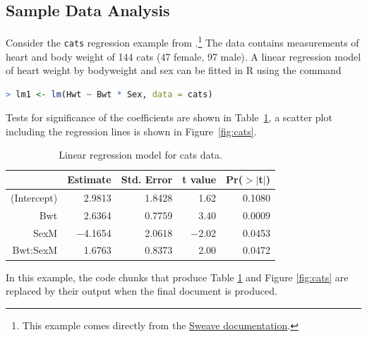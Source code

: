 \documentclass[11pt,article,oneside]{memoir}
\begin{document}
\subsection*{Sample Data Analysis} %
\label{sec:sample_data_analysis}
Consider the \texttt{cats} regression example from
\citet{venables02:_moder_applied_statis_s_plus}.\footnote{This example comes
  directly from the \href{http://www.ci.tuwien.ac.at/~leisch/Sweave/}{Sweave documentation}.} The data contains 
measurements of heart and body weight of 144 cats (47 female, 97 male). A
linear regression model of heart weight by bodyweight and sex can be fitted in
R using the command

\begin{lstlisting}[language=R,numbers=none]
> lm1 <- lm(Hwt ~ Bwt * Sex, data = cats)
\end{lstlisting}
\normalsize 
Tests for significance of the coefficients are shown in
Table~\ref{tab:coef}, a scatter plot including the regression lines is
shown in Figure~\ref{fig:cats}.


\begin{table}[ht]
\footnotesize
\begin{center}
\begin{tabular}{rrrrr}
\hline
 & Estimate & Std. Error & t value & Pr($>$$|$t$|$) \\
\hline
(Intercept) & 2.9813 & 1.8428 & 1.62 & 0.1080 \\
Bwt & 2.6364 & 0.7759 & 3.40 & 0.0009 \\
SexM & $-$4.1654 & 2.0618 & $-$2.02 & 0.0453 \\
Bwt:SexM & 1.6763 & 0.8373 & 2.00 & 0.0472 \\
\hline
\end{tabular}
\caption{\small Linear regression model for cats data.}
\label{tab:coef}
\end{center}
\end{table}
\normalsize 

In this example, the code chunks that produce Table \ref{tab:coef} and Figure
\ref{fig:cats} are replaced by their output when the final document is produced. 
\end{document}
